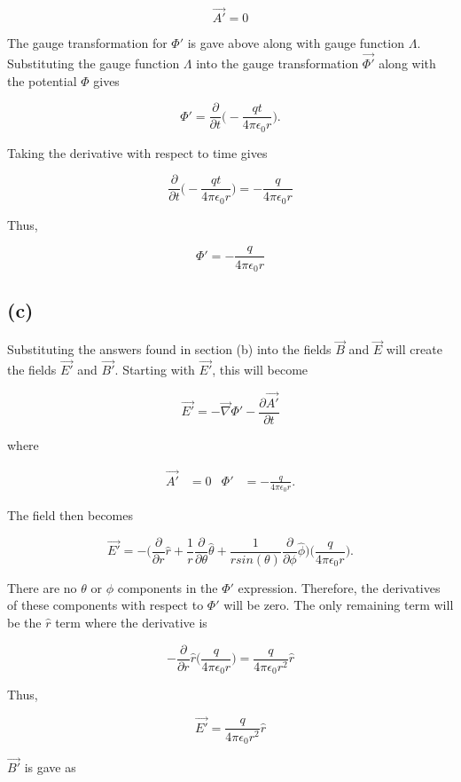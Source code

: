 \documentclass[11pt]{article}
\begin{document}
$$
\vec{A'} = 0 
$$

The gauge transformation for $\Phi'$ is gave above along with gauge function $\Lambda$. Substituting the gauge function $\Lambda$ into the gauge transformation $\vec{\Phi'}$ along with the potential $\Phi$ gives

$$
\Phi' = \frac{\partial}{\partial t} \Bigg(-\frac{qt}{4\pi\epsilon_{0}r}\Bigg).
$$

Taking the derivative with respect to time gives

$$
 \frac{\partial}{\partial t} \Bigg(-\frac{qt}{4\pi\epsilon_{0}r}\Bigg) = -\frac{q}{4\pi\epsilon_{0}r}
$$

Thus,

$$
\Phi' = -\frac{q}{4\pi\epsilon_{0}r}
$$

\subsection*{(c)}

Substituting the answers found in section (b) into the fields $\vec{B}$ and $\vec{E}$ will create the fields $\vec{E'}$ and $\vec{B'}$. Starting with $\vec{E'}$, this will become

$$
\Vec{E'} = -\Vec{\nabla} \Phi' - \frac{\partial \vec{A'}}{\partial t}
$$

where

\begin{align*}
    \vec{A'} &= 0 &
    \Phi' &= -\frac{q}{4\pi\epsilon_{0}r}.
\end{align*}

The field then becomes

$$
\Vec{E'} = -\Bigg(\frac{\partial}{\partial r} \hat{r} + \frac{1}{r} \frac{\partial}{\partial \theta} \hat{\theta} + \frac{1}{rsin(\theta)}\frac{\partial}{\partial \phi} \hat{\phi}\Bigg)  \Bigg(\frac{q}{4\pi\epsilon_{0}r}\Bigg).
$$

There are no $\theta$ or $\phi$ components in the $\Phi'$ expression. Therefore, the derivatives of these components with respect to $\Phi'$ will be zero. The only remaining term will be the $\hat{r}$ term where the derivative is 

$$
-\frac{\partial}{\partial r} \hat{r} \Bigg(\frac{q}{4\pi\epsilon_{0}r}\Bigg) = \frac{q}{4\pi\epsilon_{0}r^{2}} \hat{r}
$$

Thus,

$$
\Vec{E'} = \frac{q}{4\pi\epsilon_{0}r^{2}} \hat{r}
$$

$\Vec{B'}$ is gave as 
\end{document}
